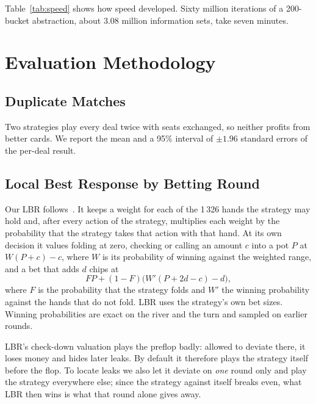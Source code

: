 \documentclass{ieeeaccess}
\begin{document}
Table~\ref{tab:speed} shows how speed developed. Sixty million iterations of a 200-bucket
abstraction, about 3.08 million information sets, take seven minutes.

\section{Evaluation Methodology}
\label{sec:evaluation}

\subsection{Duplicate Matches}
Two strategies play every deal twice with seats exchanged, so neither profits from better cards.
We report the mean and a 95\% interval of $\pm1.96$ standard errors of the per-deal result.

\subsection{Local Best Response by Betting Round}
Our LBR follows~\cite{lisy2017}. It keeps a weight for each of the 1\,326 hands the strategy may
hold and, after every action of the strategy, multiplies each weight by the probability that the
strategy takes that action with that hand. At its own decision it values folding at zero,
checking or calling an amount $c$ into a pot $P$ at $W(P+c)-c$, where $W$ is its probability of
winning against the weighted range, and a bet that adds $d$ chips at
\begin{equation}
F P + (1-F)\big(W'(P+2d-c)-d\big),
\label{eq:lbr}
\end{equation}
where $F$ is the probability that the strategy folds and $W'$ the winning probability against
the hands that do not fold. LBR uses the strategy's own bet sizes. Winning probabilities are
exact on the river and the turn and sampled on earlier rounds.

LBR's check-down valuation plays the preflop badly: allowed to deviate there, it loses money and
hides later leaks. By default it therefore plays the strategy itself before the flop. To locate
leaks we also let it deviate on \emph{one} round only and play the strategy everywhere else;
since the strategy against itself breaks even, what LBR then wins is what that round alone
gives away.
\end{document}
